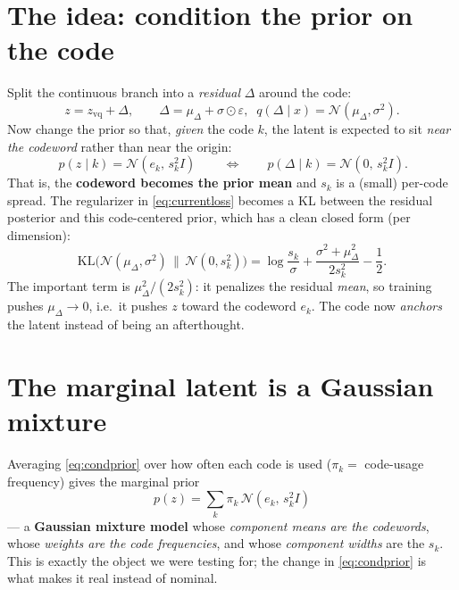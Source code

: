 \documentclass[11pt]{article}
\newcommand{\N}{\mathcal{N}}
\newcommand{\zvq}{z_{\text{vq}}}
\begin{document}
\section{The idea: condition the prior on the code}
Split the continuous branch into a \emph{residual} $\Delta$ around the code:
\begin{equation}
z = \zvq + \Delta, \qquad \Delta = \mu_\Delta + \sigma\odot\varepsilon,\;\;
q(\Delta\mid x)=\N(\mu_\Delta,\sigma^2).
\end{equation}
Now change the prior so that, \emph{given} the code $k$, the latent is expected to sit
\emph{near the codeword} rather than near the origin:
\begin{equation}
\boxed{\,p(z\mid k)=\N(e_k,\,s_k^2 I)\,}
\qquad\Longleftrightarrow\qquad
p(\Delta\mid k)=\N(0,\,s_k^2 I).
\label{eq:condprior}
\end{equation}
That is, the \textbf{codeword becomes the prior mean} and $s_k$ is a (small) per-code spread.
The regularizer in \eqref{eq:currentloss} becomes a KL between the residual posterior and this
code-centered prior, which has a clean closed form (per dimension):
\begin{equation}
\mathrm{KL}\!\big(\N(\mu_\Delta,\sigma^2)\,\|\,\N(0,s_k^2)\big)
= \log\frac{s_k}{\sigma} + \frac{\sigma^2 + \mu_\Delta^2}{2 s_k^2} - \frac12 .
\label{eq:kl}
\end{equation}
The important term is $\mu_\Delta^2/(2s_k^2)$: it penalizes the residual \emph{mean}, so training
pushes $\mu_\Delta\to 0$, i.e.\ it pushes $z$ toward the codeword $e_k$. The code now
\emph{anchors} the latent instead of being an afterthought.

\section{The marginal latent is a Gaussian mixture}
Averaging \eqref{eq:condprior} over how often each code is used
($\pi_k=$ code-usage frequency) gives the marginal prior
\begin{equation}
\boxed{\,p(z)=\sum_{k} \pi_k\,\N(e_k,\,s_k^2 I)\,}
\label{eq:gmm}
\end{equation}
--- a \textbf{Gaussian mixture model} whose \emph{component means are the codewords}, whose
\emph{weights are the code frequencies}, and whose \emph{component widths} are the $s_k$. This is
exactly the object we were testing for; the change in \eqref{eq:condprior} is what makes it real
instead of nominal.
\end{document}
